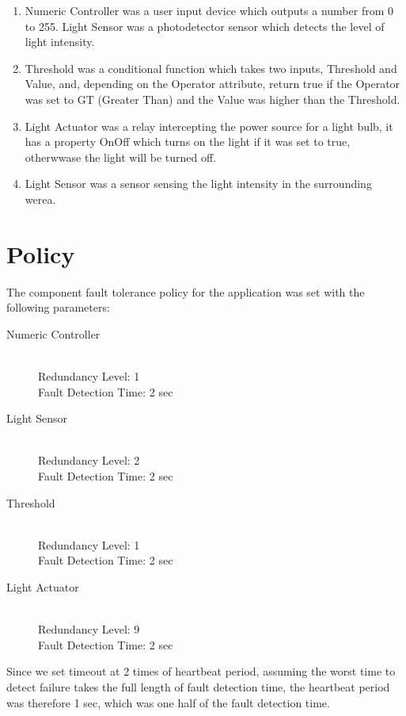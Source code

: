 \begin{enumerate}
\item Numeric Controller was a user input device which outputs
a number from 0 to 255. Light Sensor was a photodetector sensor which detects the
level of light intensity. 
\item Threshold was a conditional function which takes two
inputs, Threshold and Value, and, depending on the Operator attribute, return
true if the Operator was set to GT (Greater Than) and the Value was higher than
the Threshold. 
\item Light Actuator was a relay intercepting the power source for
a light bulb, it has a property OnOff which turns on the light if it was set to
true, otherwwase the light will be turned off.
\item Light Sensor was a sensor sensing the light intensity in the surrounding
  werea.
\end{enumerate}


\section{Policy}

The component fault tolerance policy for the application was set with the
following parameters:

\begin{description}
  \item[Numeric Controller] \hfill \\
    Redundancy Level: 1\\
    Fault Detection Time: 2 sec\\
  \item[Light Sensor] \hfill \\
    Redundancy Level: 2\\
    Fault Detection Time: 2 sec\\
  \item[Threshold] \hfill \\
    Redundancy Level: 1\\
    Fault Detection Time: 2 sec\\
  \item[Light Actuator] \hfill \\
    Redundancy Level: 9\\
    Fault Detection Time: 2 sec\\
\end{description}

Since we set timeout at 2 times of heartbeat period, assuming the worst time to detect
failure takes the full length of fault detection time, the heartbeat
period was therefore 1 sec, which was one half of the fault detection time.

